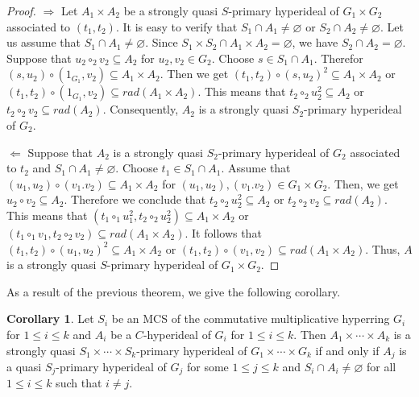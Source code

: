 \documentclass[preprint,review,10pt]{amsart}
\theoremstyle{definition}
\newtheorem{corollary}[theorem]{Corollary}
\theoremstyle{remark}
\numberwithin{equation}{section}
\begin{document}
\begin{proof}
$ \Longrightarrow $  Let $A_1 \times A_2$ be  a strongly quasi $S$-primary hyperideal of $G_1 \times G_2$ associated to $(t_1,t_2)$. It is easy to verify that   $S_1 \cap A_1 \neq \varnothing$ or $S_2 \cap A_2 \neq  \varnothing$. Let us assume that $S_1 \cap A_1 \neq \varnothing$. Since $S_1 \times S_2 \cap A_1 \times A_2 =\varnothing$, we have  $S_2 \cap A_2 =\varnothing$. Suppose  that $u_2 \circ_2 v_2 \subseteq A_2$ for $u_2,v_2 \in G_2$. Choose $s \in S_1 \cap A_1$. Therefor  $(s,u_2) \circ (1_{G_1},v_2) \subseteq A_1 \times A_2$. Then we get $(t_1,t_2) \circ (s,u_2)^2 \subseteq  A_1 \times A_2 $ or $(t_1,t_2) \circ (1_{G_1},v_2) \subseteq rad(A_1 \times A_2)$. This means that $t_2 \circ_2 u_2^2 \subseteq   A_2 $ or $t_2 \circ_2 v_2 \subseteq  rad(A_2)$. Consequently, $A_2$ is a strongly quasi $S_2$-primary hyperideal of $G_2$.

$ \Longleftarrow $  Suppose that  $A_2$ is a strongly quasi $S_2$-primary hyperideal of $G_2$ associated to $t_2$ and $S_1 \cap A_1 \neq \varnothing$.  Choose $t_1 \in S_1 \cap A_1$. Assume that  $(u_1,u_2)  \circ (v_1.v_2) \subseteq A_1 \times A_2$ for $(u_1,u_2) ,  (v_1.v_2) \in G_1 \times G_2$. Then, we get $u_2 \circ v_2 \subseteq A_2$. Therefore we conclude that  $t_2 \circ_2 u_2^2 \subseteq  A_2 $ or $t_2 \circ_2 v_2 \subseteq rad(A_2)$. This means  that $(t_1 \circ_1 u_1^2,t_2 \circ_2 u_2^2) \subseteq  A_1 \times A_2 $ or $(t_1 \circ_1 v_1,t_2 \circ_2 v_2) \subseteq rad(A_1 \times A_2)$. It follows that  $(t_1,t_2) \circ (u_1,u_2)^2 \subseteq A_1 \times A_2$ or $(t_1,t_2) \circ (v_1,v_2) \subseteq rad(A_1 \times A_2)$. Thus, $A$ is a strongly quasi $S$-primary hyperideal of $G_1 \times G_2$.
\end{proof}
As a result of the previous   theorem, we give the following corollary.
\begin{corollary}
Let  $S_i$ be an MCS of the commutative multiplicative hyperring $G_i$ for   $1 \leq i \leq k$ and     $A_i$ be a $C$-hyperideal of   $G_i$ for   $1 \leq i \leq k$. Then   $ A_1 \times \cdots \times A_k$  is a strongly quasi $S_1 \times \cdots \times S_k$-primary hyperideal of $ G_1 \times \cdots \times  G_k$ if and only if   $A_j$ is a quasi $S_j$-primary hyperideal of $G_j$ for some $1 \leq j \leq k$ and $S_i \cap A_i \neq \varnothing$ for all $1 \leq i \leq k$ such that $i \neq j$. 
\end{corollary}
\end{document}
